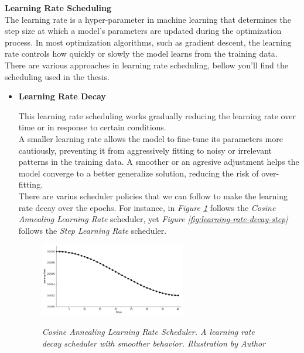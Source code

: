 \vspace{0.5cm}
\textbf{Learning Rate Scheduling} \\

The learning rate is a hyper-parameter in machine learning that determines the step size at which a model's parameters are updated during the optimization process. In most optimization algorithms, such as gradient descent, the learning rate controls how quickly or slowly the model learns from the training data. \\

There are various approaches in learning rate scheduling, bellow you'll find the scheduling used in the thesis.

\newpage

\begin{itemize}
    \item \textbf{Learning Rate Decay}

    This learning rate scheduling works gradually reducing
    the learning rate over time or in response to certain conditions. \\

    A smaller learning rate allows the model to fine-tune its parameters more cautiously,
    preventing it from aggressively fitting to noisy or irrelevant patterns in the training data.
    A smoother or an agresive adjustment helps the model converge to a better generalize solution,
    reducing the risk of over-fitting. \\

    There are varius scheduler policies that we can follow to make the learning rate decay over
    the epochs. For instance, in \textit{Figure \ref{fig:learning-rate-decay-cosine-annealing}} follows the \textit{Cosine Annealing Learning Rate} scheduler, yet
    \textit{Figure \ref{fig:learning-rate-decay-step}} follows the \textit{Step Learning Rate} scheduler.

    \begin{figure}[H]
    \centering
    \includegraphics[width=0.6\textwidth]{imatges/preliminaries/cosinus-scheduler.png}
    \caption[Cosine Annealing Learning Rate Scheduler]{\textit{Cosine Annealing Learning Rate Scheduler. A learning rate decay scheduler with smoother behavior.
      Illustration by Author}}
    {\label{fig:learning-rate-decay-cosine-annealing}}
    \end{figure}


\end{itemize}
